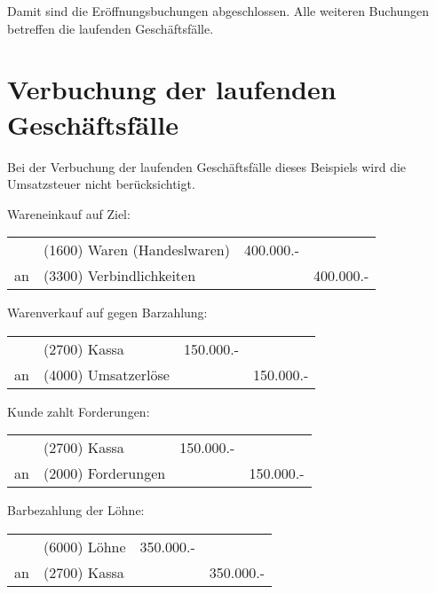 \documentclass[parskip=half,12pt,a4paper]{scrartcl}
\begin{document}
Damit sind die Eröffnungsbuchungen abgeschlossen. Alle weiteren Buchungen betreffen die laufenden Geschäftsfälle.

\section{Verbuchung der laufenden Geschäftsfälle}

Bei der Verbuchung der laufenden Geschäftsfälle dieses Beispiels wird die Umsatzsteuer nicht berücksichtigt.

Wareneinkauf auf Ziel:

\begin{center}
\begin{tabularx}{\textwidth}{rXrr}
 \toprule
    & (1600) Waren (Handeslwaren) & 400.000.- &\\
 an & (3300) Verbindlichkeiten & & 400.000.-\\
\bottomrule
\end{tabularx}
\end{center}

Warenverkauf auf gegen Barzahlung:

\begin{center}
	\begin{tabularx}{\textwidth}{rXrr}
		\toprule
		& (2700) Kassa & 150.000.- &\\
		an & (4000) Umsatzerlöse & & 150.000.-\\
		\bottomrule
	\end{tabularx}
\end{center}

Kunde zahlt Forderungen:

\begin{center}
	\begin{tabularx}{\textwidth}{rXrr}
		\toprule
		& (2700) Kassa & 150.000.- &\\
		an & (2000) Forderungen & & 150.000.-\\
		\bottomrule
	\end{tabularx}
\end{center}

Barbezahlung der Löhne:

\begin{center}
	\begin{tabularx}{\textwidth}{rXrr}
		\toprule
		& (6000) Löhne & 350.000.- &\\
		an & (2700) Kassa & & 350.000.-\\
		\bottomrule
	\end{tabularx}
\end{center}
\end{document}
